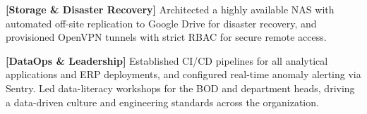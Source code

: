 \begin{resume_list}
  \item \textbf{[Storage \& Disaster Recovery]} Architected a highly available NAS with automated off-site replication to Google Drive for disaster recovery, and provisioned OpenVPN tunnels with strict RBAC for secure remote access.
  \item \textbf{[DataOps \& Leadership]} Established CI/CD pipelines for all analytical applications and ERP deployments, and configured real-time anomaly alerting via Sentry. Led data-literacy workshops for the BOD and department heads, driving a data-driven culture and engineering standards across the organization.
\end{resume_list}
